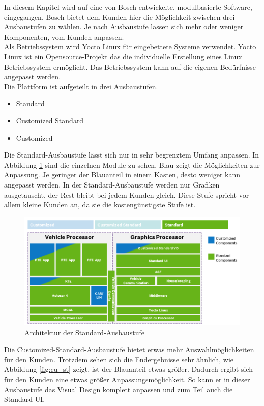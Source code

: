In diesem Kapitel wird auf eine von Bosch entwickelte, modulbasierte Software, eingegangen. Bosch bietet dem Kunden hier die Möglichkeit zwischen drei Ausbaustufen zu wählen. Je nach Ausbaustufe lassen sich mehr oder weniger Komponenten, vom Kunden anpassen.\\

Als Betriebssystem wird Yocto Linux für eingebettete Systeme verwendet. Yocto Linux ist ein Opensource-Projekt das die individuelle Erstellung eines Linux Betriebssystem ermöglicht. Das Betriebssystem kann auf die eigenen Bedürfnisse angepasst werden.\\

Die Plattform ist aufgeteilt in drei Ausbaustufen.
\begin{itemize}
	\item Standard
	\item Customized Standard
	\item Customized 
\end{itemize}

Die Standard-Ausbaustufe lässt sich nur in sehr begrenztem Umfang anpassen. In Abbildung \ref{fig:standard} sind die einzelnen Module zu sehen. Blau zeigt die Möglichkeiten zur Anpassung. Je geringer der Blauanteil in einem Kasten, desto weniger kann angepasst werden. In der Standard-Ausbaustufe werden nur Grafiken ausgetauscht, der Rest bleibt bei jedem Kunden gleich. Diese Stufe spricht vor allem kleine Kunden an, da sie die kostengünstigste Stufe ist.

\begin{figure}[htb]
	\centering
	\includegraphics[width=\textwidth]{img/2_stand_der_technik/STICC_3_neu}
	\caption[Architektur der Standard-Ausbaustufe]{Architektur der Standard-Ausbaustufe \cite{bosch}}
	\label{fig:standard}
\end{figure}

Die Customized-Standard-Ausbaustufe bietet etwas mehr Auswahlmöglichkeiten für den Kunden. Trotzdem sehen sich die Endergebnisse sehr ähnlich, wie Abbildung \ref{fig:cu_st} zeigt, ist der Blauanteil etwas größer. Dadurch ergibt sich für den Kunden eine etwas größer Anpassungsmöglichkeit. So kann er in dieser Ausbaustufe das Visual Design komplett anpassen und zum Teil auch die Standard UI. \\

